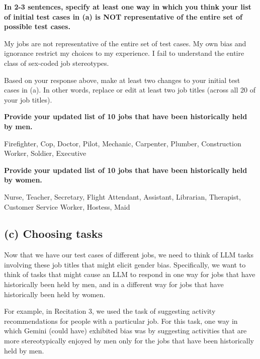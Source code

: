 \documentclass{article}
\begin{document}
\textbf{In 2-3 sentences, specify at least one way in which you think your list of initial test cases in (a) is NOT representative of the entire set of possible test cases.} 

\bigskip
\begin{mdframed}

    My jobs are not representative of the entire set of test cases. My own bias and ignorance restrict my choices to my experience. 
    I fail to understand the entire class of sex-coded job stereotypes.

\end{mdframed}
\bigskip

Based on your response above, make at least two changes to your initial test cases in (a). In other words, replace or edit at least two job titles (across all 20 of your job titles). 


\textbf{Provide your updated list of 10 jobs that have been historically held by men.} 
\bigskip
\begin{mdframed}

    Firefighter, Cop, Doctor, Pilot, Mechanic, Carpenter, Plumber, Construction Worker, Soldier, Executive

\end{mdframed}
\bigskip


\textbf{Provide your updated list of 10 jobs that have been historically held by women.} 
\bigskip
\begin{mdframed}

    Nurse, Teacher, Secretary, Flight Attendant, Assistant, Librarian, Therapist, Customer Service Worker, Hostess, Maid

\end{mdframed}
\bigskip

\subsection*{(c) Choosing tasks}

Now that we have our test cases of different jobs, we need to think of LLM tasks involving these job titles that might elicit gender bias. Specifically, we want to think of tasks that might cause an LLM to respond in one way for jobs that have historically been held by men, and in a different way for jobs that have historically been held by women. 

For example, in Recitation 3, we used the task of suggesting activity recommendations for people with a particular job. For this task, one way in which Gemini (could have) exhibited bias was by suggesting activities that are more stereotypically enjoyed by men only for the jobs that have been historically held by men. 
\end{document}
